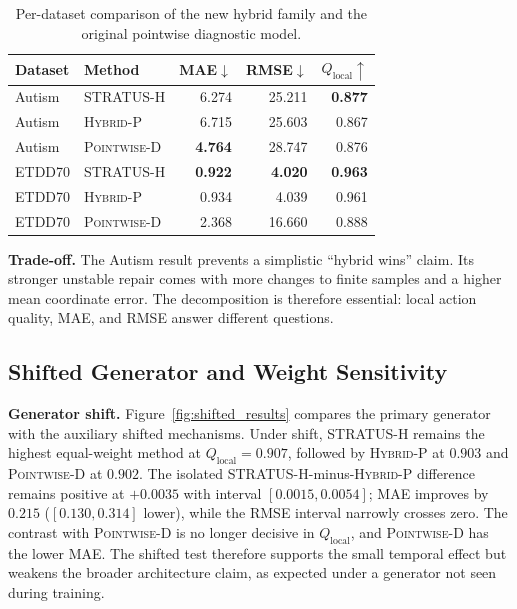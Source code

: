 \documentclass[sigconf,review]{acmart}
\newcommand{\methodP}{\textsc{Pointwise-D}\xspace}
\newcommand{\methodHP}{\textsc{Hybrid-P}\xspace}
\newcommand{\methodH}{\textsc{STRATUS-H}\xspace}
\begin{document}
\begin{table}[h]
\centering
\caption{Per-dataset comparison of the new hybrid family and the original pointwise diagnostic model.}
\label{tab:dataset_results}
\footnotesize
\setlength{\tabcolsep}{3.0pt}
\begin{tabular}{llrrr}
\toprule
Dataset & Method & MAE$\downarrow$ & RMSE$\downarrow$ & $Q_{\mathrm{local}}\uparrow$ \\
\midrule
Autism & \methodH & 6.274 & 25.211 & \textbf{0.877} \\
Autism & \methodHP & 6.715 & 25.603 & 0.867 \\
Autism & \methodP & \textbf{4.764} & 28.747 & 0.876 \\
\midrule
ETDD70 & \methodH & \textbf{0.922} & \textbf{4.020} & \textbf{0.963} \\
ETDD70 & \methodHP & 0.934 & 4.039 & 0.961 \\
ETDD70 & \methodP & 2.368 & 16.660 & 0.888 \\
\bottomrule
\end{tabular}
\end{table}





\textbf{Trade-off.} The Autism result prevents a simplistic ``hybrid wins'' claim. Its stronger unstable repair comes with more changes to finite samples and a higher mean coordinate error. The decomposition is therefore essential: local action quality, MAE, and RMSE answer different questions.

\subsection{Shifted Generator and Weight Sensitivity}
\textbf{Generator shift.} Figure~\ref{fig:shifted_results} compares the primary generator with the auxiliary shifted mechanisms. Under shift, \methodH remains the highest equal-weight method at $Q_{\mathrm{local}}=0.907$, followed by \methodHP at $0.903$ and \methodP at $0.902$. The isolated \methodH-minus-\methodHP difference remains positive at $+0.0035$ with interval $[0.0015,0.0054]$; MAE improves by $0.215$ ($[0.130,0.314]$ lower), while the RMSE interval narrowly crosses zero. The contrast with \methodP is no longer decisive in $Q_{\mathrm{local}}$, and \methodP has the lower MAE. The shifted test therefore supports the small temporal effect but weakens the broader architecture claim, as expected under a generator not seen during training.
\end{document}
